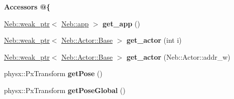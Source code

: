 \begin{Indent}{\bf \-Accessors @\{}\par
\begin{DoxyCompactItemize}
\item 
\hypertarget{classNeb_1_1Scene_1_1Base_ac94aa8055519ab639c12855d307afc03}{\hyperlink{classNeb_1_1weak__ptr}{\-Neb\-::weak\-\_\-ptr}$<$ \hyperlink{classNeb_1_1app}{\-Neb\-::app} $>$ {\bfseries get\-\_\-app} ()}\label{classNeb_1_1Scene_1_1Base_ac94aa8055519ab639c12855d307afc03}

\item 
\hypertarget{classNeb_1_1Scene_1_1Base_a05710d66982eb1aa9e4c45e431afcc00}{\hyperlink{classNeb_1_1weak__ptr}{\-Neb\-::weak\-\_\-ptr}$<$ \hyperlink{classNeb_1_1Actor_1_1Base}{\-Neb\-::\-Actor\-::\-Base} $>$ {\bfseries get\-\_\-actor} (int i)}\label{classNeb_1_1Scene_1_1Base_a05710d66982eb1aa9e4c45e431afcc00}

\item 
\hypertarget{classNeb_1_1Scene_1_1Base_a860fec1442e946c0da26373109480dda}{\hyperlink{classNeb_1_1weak__ptr}{\-Neb\-::weak\-\_\-ptr}$<$ \hyperlink{classNeb_1_1Actor_1_1Base}{\-Neb\-::\-Actor\-::\-Base} $>$ {\bfseries get\-\_\-actor} (\-Neb\-::\-Actor\-::addr\-\_\-w)}\label{classNeb_1_1Scene_1_1Base_a860fec1442e946c0da26373109480dda}

\item 
\hypertarget{classNeb_1_1Scene_1_1Base_a9425aed0f7a62b57cc9e85838d3d8e93}{physx\-::\-Px\-Transform {\bfseries get\-Pose} ()}\label{classNeb_1_1Scene_1_1Base_a9425aed0f7a62b57cc9e85838d3d8e93}

\item 
\hypertarget{classNeb_1_1Scene_1_1Base_a9c063f947be2488466ded4657dc693e5}{physx\-::\-Px\-Transform {\bfseries get\-Pose\-Global} ()}\label{classNeb_1_1Scene_1_1Base_a9c063f947be2488466ded4657dc693e5}

\end{DoxyCompactItemize}
\end{Indent}
